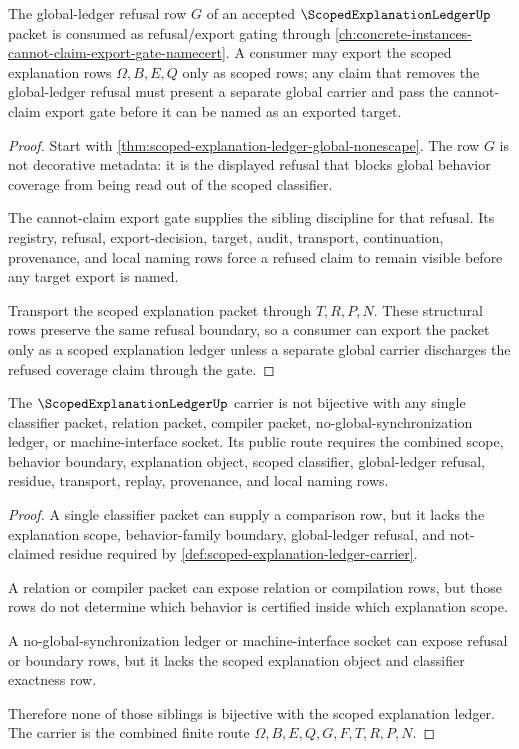 \begin{theorem}
\label{thm:scoped-explanation-ledger-cannot-claim-dependency}
The global-ledger refusal row $G$ of an accepted $\ScopedExplanationLedgerUp$ packet is consumed as refusal/export gating through \autoref{ch:concrete-instances-cannot-claim-export-gate-namecert}. A consumer may export the scoped explanation rows $\Omega,B,E,Q$ only as scoped rows; any claim that removes the global-ledger refusal must present a separate global carrier and pass the cannot-claim export gate before it can be named as an exported target.
\end{theorem}
\begin{proof}
Start with \autoref{thm:scoped-explanation-ledger-global-nonescape}. The row $G$ is not decorative metadata: it is the displayed refusal that blocks global behavior coverage from being read out of the scoped classifier.

The cannot-claim export gate supplies the sibling discipline for that refusal. Its registry, refusal, export-decision, target, audit, transport, continuation, provenance, and local naming rows force a refused claim to remain visible before any target export is named.

Transport the scoped explanation packet through $T,R,P,N$. These structural rows preserve the same refusal boundary, so a consumer can export the packet only as a scoped explanation ledger unless a separate global carrier discharges the refused coverage claim through the gate.
\end{proof}

\begin{theorem}
\label{thm:scoped-explanation-ledger-sibling-independence}
The $\ScopedExplanationLedgerUp$ carrier is not bijective with any single classifier packet, relation packet, compiler packet, no-global-synchronization ledger, or machine-interface socket. Its public route requires the combined scope, behavior boundary, explanation object, scoped classifier, global-ledger refusal, residue, transport, replay, provenance, and local naming rows.
\end{theorem}
\begin{proof}
A single classifier packet can supply a comparison row, but it lacks the explanation scope, behavior-family boundary, global-ledger refusal, and not-claimed residue required by \autoref{def:scoped-explanation-ledger-carrier}.

A relation or compiler packet can expose relation or compilation rows, but those rows do not determine which behavior is certified inside which explanation scope.

A no-global-synchronization ledger or machine-interface socket can expose refusal or boundary rows, but it lacks the scoped explanation object and classifier exactness row.

Therefore none of those siblings is bijective with the scoped explanation ledger. The carrier is the combined finite route $\Omega,B,E,Q,G,F,T,R,P,N$.
\end{proof}

